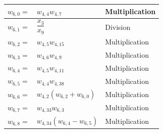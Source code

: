 \begin{longtable}{|p{1.5cm}|l|p{2cm}|}
$w_{6,0}=$ & $ w_{4,4}w_{4,7} $ & Multiplication \\ \hline
$w_{6,1}=$ & $ \dfrac{x_{3}}{x_{9}} $ & Division \\ \hline
$w_{6,2}=$ & $ w_{4,5}w_{4,15} $ & Multiplication \\ \hline
$w_{6,3}=$ & $ w_{4,6}w_{4,9} $ & Multiplication \\ \hline
$w_{6,4}=$ & $ w_{4,5}w_{4,11} $ & Multiplication \\ \hline
$w_{6,5}=$ & $ w_{4,4}w_{4,38} $ & Multiplication \\ \hline
$w_{6,6}=$ & $ w_{4,2}\left(w_{6,2}+w_{6,0}\right) $ & Multiplication \\ \hline
$w_{6,7}=$ & $ w_{4,33}w_{6,3} $ & Multiplication \\ \hline
$w_{6,8}=$ & $ w_{4,34}\left(w_{6,4}-w_{6,5}\right) $ & Multiplication \\ \hline


\end{longtable}
